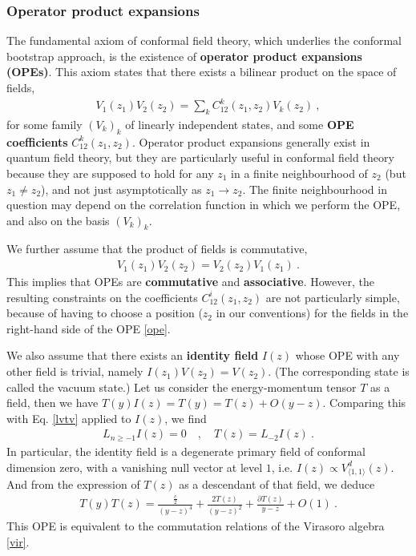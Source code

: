\documentclass[12pt, a4paper]{article}
\newcommand{\myindex}[1]{\textbf{\boldmath #1}}
\theoremstyle{break}
\begin{document}
\subsubsection{Operator product expansions}\label{sec:ope}

The fundamental axiom of conformal field theory, which underlies the conformal bootstrap approach, is the existence of \myindex{operator product expansions (OPEs)}. This axiom states that there exists a bilinear product on the space of fields, 
\begin{align}
  \boxed{V_1(z_1)V_2(z_2) = \sum_k C^k_{12}(z_1,z_2) V_k(z_2)}\ ,
  \label{ope}
 \end{align}
 for some family $(V_k)_k$ of linearly independent states, and 
some \myindex{OPE coefficients} $C^k_{12}(z_1,z_2)$. Operator product expansions generally exist in quantum field theory, but they are particularly useful in conformal field theory because they are supposed to hold for any $z_1$ in a finite neighbourhood of $z_2$ (but $z_1\neq z_2$), and not just asymptotically as $z_1\to z_2$. The finite neighbourhood in question may depend on the correlation function in which we perform the OPE, and also on the basis $(V_k)_k$. 

We further assume that the product of fields is commutative,
\begin{align}
 \boxed{V_1(z_1)V_2(z_2) = V_2(z_2)V_1(z_1)}\ .
 \label{comm}
\end{align}
This implies that OPEs are \myindex{commutative} and \myindex{associative}. However, the resulting constraints on the coefficients $C^i_{12}(z_1,z_2)$ are not particularly simple, because of having to choose a position ($z_2$ in our conventions) for the fields in the right-hand side of the OPE \eqref{ope}. 

We also assume that there exists an \myindex{identity field} $I(z)$ whose OPE with any other field is trivial, namely $I(z_1)V(z_2) = V(z_2)$. (The corresponding state is called the vacuum state.) Let us consider the energy-momentum tensor $T$ as a field, then we have 
$
 T(y)I(z) = T(y) = T(z)  + O(y-z)
$. 
Comparing this with Eq. \eqref{lvtv} applied to $I(z)$, we find 
\begin{align}
 L_{n\geq -1} I(z) = 0 \quad , \quad T(z) = L_{-2}I(z)\ .
\end{align}
In particular, the identity field is a degenerate primary field of conformal dimension zero, with a vanishing null vector at level $1$, i.e. $I(z) \propto V^d_{\langle 1,1\rangle}(z)$. And from the expression of $T(z)$ as a descendant of that field, we deduce
\begin{align}
 T(y)T(z) = \frac{\frac{c}{2}}{(y-z)^4} + \frac{2T(z)}{(y-z)^2} + \frac{\partial T(z)}{y-z} + O(1)\ .
\label{tt}
\end{align}
This OPE is equivalent to the commutation relations of the Virasoro algebra \eqref{vir}.
\end{document}
